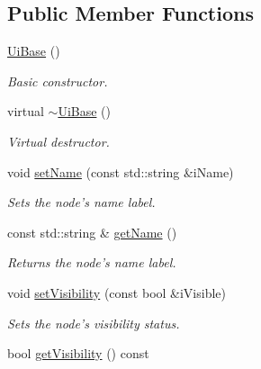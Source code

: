 \subsection*{Public Member Functions}
\begin{DoxyCompactItemize}
\item 
\hypertarget{class_ui_base_aa35daf5ae2718e027d4ab20458422fa5}{\hyperlink{class_ui_base_aa35daf5ae2718e027d4ab20458422fa5}{Ui\-Base} ()}\label{class_ui_base_aa35daf5ae2718e027d4ab20458422fa5}

\begin{DoxyCompactList}\small\item\em Basic constructor. \end{DoxyCompactList}\item 
\hypertarget{class_ui_base_acb1205d916c03f8adef8d1b8e9a7c845}{virtual \hyperlink{class_ui_base_acb1205d916c03f8adef8d1b8e9a7c845}{$\sim$\-Ui\-Base} ()}\label{class_ui_base_acb1205d916c03f8adef8d1b8e9a7c845}

\begin{DoxyCompactList}\small\item\em Virtual destructor. \end{DoxyCompactList}\item 
\hypertarget{class_ui_base_a892c9cdf2806b1ad5e901fe6b4647d2f}{void \hyperlink{class_ui_base_a892c9cdf2806b1ad5e901fe6b4647d2f}{set\-Name} (const std\-::string \&i\-Name)}\label{class_ui_base_a892c9cdf2806b1ad5e901fe6b4647d2f}

\begin{DoxyCompactList}\small\item\em Sets the node's name label. \end{DoxyCompactList}\item 
\hypertarget{class_ui_base_a3123da01bae418158015a6ebc7a584a3}{const std\-::string \& \hyperlink{class_ui_base_a3123da01bae418158015a6ebc7a584a3}{get\-Name} ()}\label{class_ui_base_a3123da01bae418158015a6ebc7a584a3}

\begin{DoxyCompactList}\small\item\em Returns the node's name label. \end{DoxyCompactList}\item 
\hypertarget{class_ui_base_a96e43e72b7f0cb7f6ad5b2e2ed1cda2b}{void \hyperlink{class_ui_base_a96e43e72b7f0cb7f6ad5b2e2ed1cda2b}{set\-Visibility} (const bool \&i\-Visible)}\label{class_ui_base_a96e43e72b7f0cb7f6ad5b2e2ed1cda2b}

\begin{DoxyCompactList}\small\item\em Sets the node's visibility status. \end{DoxyCompactList}\item 
\hypertarget{class_ui_base_accd4e1963e03fcc920b5f4af63d1f404}{bool \hyperlink{class_ui_base_accd4e1963e03fcc920b5f4af63d1f404}{get\-Visibility} () const }\label{class_ui_base_accd4e1963e03fcc920b5f4af63d1f404}


\end{DoxyCompactItemize}
